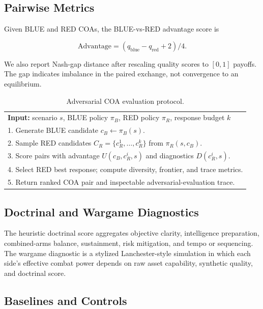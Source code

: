 \documentclass[letterpaper]{article}
\begin{document}
\subsection{Pairwise Metrics}

Given BLUE and RED COAs, the BLUE-vs-RED advantage score is

\begin{equation}
\mathrm{Advantage} = (q_{\mathrm{blue}} - q_{\mathrm{red}} + 2) / 4.
\end{equation}

We also report Nash-gap distance after rescaling quality scores to $[0,1]$ payoffs. The gap indicates imbalance in the paired exchange, not convergence to an equilibrium.

\begin{table}[t]
\centering
\scriptsize
\caption{Adversarial COA evaluation protocol.}
\label{tab:algorithm}
\begin{tabular}{@{}p{.96\linewidth}@{}}
\toprule
\textbf{Input:} scenario $s$, BLUE policy $\pi_B$, RED policy $\pi_R$, response budget $k$ \\
1. Generate BLUE candidate $c_B \leftarrow \pi_B(s)$. \\
2. Sample RED candidates $C_R=\{c_R^1,\ldots,c_R^k\}$ from $\pi_R(s,c_B)$. \\
3. Score pairs with advantage $U(c_B,c_R^i,s)$ and diagnostics $D(c_R^i,s)$. \\
4. Select RED best response; compute diversity, frontier, and trace metrics. \\
5. Return ranked COA pair and inspectable adversarial-evaluation trace. \\
\bottomrule
\end{tabular}
\end{table}

\subsection{Doctrinal and Wargame Diagnostics}

The heuristic doctrinal score aggregates objective clarity, intelligence preparation, combined-arms balance, sustainment, risk mitigation, and tempo or sequencing. The wargame diagnostic is a stylized Lanchester-style simulation in which each side's effective combat power depends on raw asset capability, synthetic quality, and doctrinal score.

\subsection{Baselines and Controls}
\end{document}
